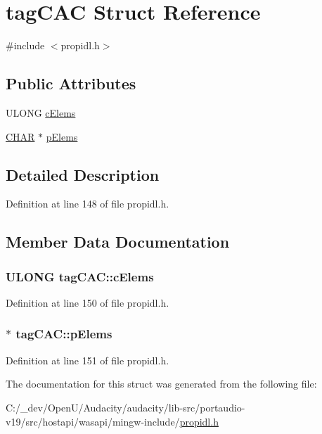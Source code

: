 \hypertarget{structtag_c_a_c}{}\section{tag\+C\+AC Struct Reference}
\label{structtag_c_a_c}


{\ttfamily \#include $<$propidl.\+h$>$}

\subsection*{Public Attributes}
\begin{DoxyCompactItemize}
\item 
U\+L\+O\+NG \hyperlink{structtag_c_a_c_a5415e2fd504d8ec1449063998d5c4381}{c\+Elems}
\item 
\hyperlink{mapinls_8h_aebb9e13210d88d43e32e735ada43a425}{C\+H\+AR} $\ast$ \hyperlink{structtag_c_a_c_aeda731fec9c2987f9ae675f222674d83}{p\+Elems}
\end{DoxyCompactItemize}


\subsection{Detailed Description}


Definition at line 148 of file propidl.\+h.



\subsection{Member Data Documentation}
\subsubsection[{\texorpdfstring{c\+Elems}{cElems}}]{\setlength{\rightskip}{0pt plus 5cm}U\+L\+O\+NG tag\+C\+A\+C\+::c\+Elems}\hypertarget{structtag_c_a_c_a5415e2fd504d8ec1449063998d5c4381}{}\label{structtag_c_a_c_a5415e2fd504d8ec1449063998d5c4381}


Definition at line 150 of file propidl.\+h.

\subsubsection[{\texorpdfstring{p\+Elems}{pElems}}]{$\ast$ tag\+C\+A\+C\+::p\+Elems}\hypertarget{structtag_c_a_c_aeda731fec9c2987f9ae675f222674d83}{}\label{structtag_c_a_c_aeda731fec9c2987f9ae675f222674d83}


Definition at line 151 of file propidl.\+h.



The documentation for this struct was generated from the following file\+:\begin{DoxyCompactItemize}
\item 
C\+:/\+\_\+dev/\+Open\+U/\+Audacity/audacity/lib-\/src/portaudio-\/v19/src/hostapi/wasapi/mingw-\/include/\hyperlink{propidl_8h}{propidl.\+h}\end{DoxyCompactItemize}

